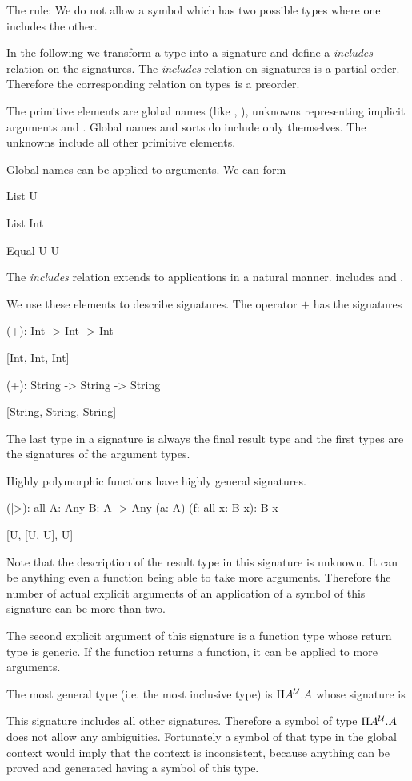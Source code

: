 The rule: We do not allow a symbol which has two possible types where one
includes the other.

In the following we transform a type into a signature and define a
\emph{includes} relation on the signatures. The \emph{includes} relation on
signatures is a partial order. Therefore the corresponding relation on types is
a preorder.

The primitive elements are global names (like , ), unknowns
 representing implicit arguments and . Global names and sorts
do include only themselves. The unknowns include all other primitive elements.

Global names can be applied to arguments. We can form
\begin{alba}
    List U

    List Int

    Equal U U \end{alba}
%
The \emph{includes} relation extends to applications in a natural manner.
 includes  and .

We use these elements to describe signatures. The operator $+$ has the
signatures
%
\begin{alba}
    (+): Int -> Int -> Int

        [Int, Int, Int]


    (+): String -> String -> String

        [String, String, String]
\end{alba}
%
The last type in a signature is always the final result type and the first types
are the signatures of the argument types.


Highly polymorphic functions have highly general signatures.
%
\begin{alba}
    (|>): all {A: Any} {B: A -> Any} (a: A) (f: all {x}: B x): B x

        [U, [U, U], U]
\end{alba}
%
Note that the description of the result type in this signature is unknown. It
can be anything even a function being able to take more arguments. Therefore the
number of actual explicit arguments of an application of a symbol of this
signature can be more than two.

The second explicit argument of this signature is a function type whose return
type is generic. If the function returns a function, it can be applied to more
arguments.

The most general type (i.e. the most inclusive type) is $\Pi A^{\cal{U}}. A$ whose
signature is
\begin{alba}
    [U]
\end{alba}
%
This signature includes all other signatures. Therefore a symbol of type $\Pi
A^{\cal{U}}. A$ does not allow any ambiguities. Fortunately a symbol of that type in
the global context would imply that the context is inconsistent, because
anything can be proved and generated having a symbol of this type.

